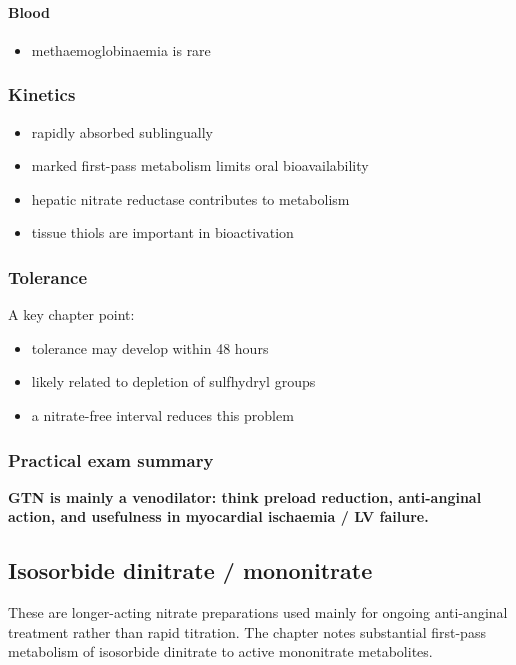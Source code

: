 \documentclass[11pt,a4paper]{article}
\begin{document}
\paragraph{Blood}
\begin{itemize}
    \item methaemoglobinaemia is rare
\end{itemize}

\subsubsection*{Kinetics}
\begin{itemize}
    \item rapidly absorbed sublingually
    \item marked first-pass metabolism limits oral bioavailability
    \item hepatic nitrate reductase contributes to metabolism
    \item tissue thiols are important in bioactivation
\end{itemize}

\subsubsection*{Tolerance}
A key chapter point:
\begin{itemize}
    \item tolerance may develop within 48 hours
    \item likely related to depletion of sulfhydryl groups
    \item a nitrate-free interval reduces this problem
\end{itemize}

\subsubsection*{Practical exam summary}

\textbf{GTN is mainly a venodilator: think preload reduction, anti-anginal action, and usefulness in myocardial ischaemia / LV failure.}

\subsection{Isosorbide dinitrate / mononitrate}

These are longer-acting nitrate preparations used mainly for ongoing anti-anginal treatment rather than rapid titration. The chapter notes substantial first-pass metabolism of isosorbide dinitrate to active mononitrate metabolites.
\end{document}
